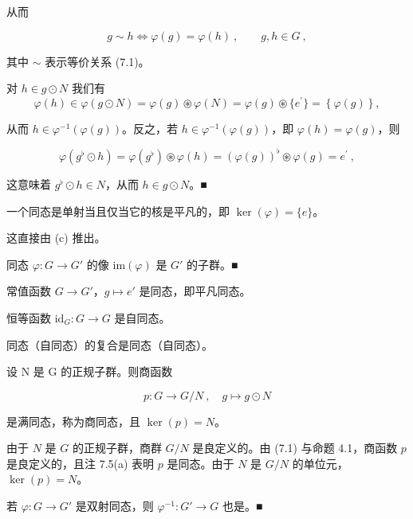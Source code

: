 \begin{remark}
\begin{items}
从而

\[
g\sim h\Longleftrightarrow\varphi(g)=\varphi(h)~,\qquad g,h\in G~,
\]

其中 $ \sim $ 表示等价关系 (7.1)。

\proofhead
对 $ h \in g \odot N $ 我们有
\[
\varphi(h)\in\varphi(g\odot N)=\varphi(g)\circledast\varphi(N)=\varphi(g)\circledast\{e^{\prime}\}=\left\{\varphi(g)\right\},
\]

从而 $ h \in \varphi^{-1}(\varphi(g)) $。反之，若 $ h \in \varphi^{-1}(\varphi(g)) $，即 $ \varphi(h) = \varphi(g) $，则

\[
\varphi(g^{\flat}\odot h)=\varphi(g^{\flat})\circledast\varphi(h)=\left(\varphi(g)\right)^{\flat}\circledast\varphi(g)=e^{\prime}~,
\]

这意味着 $ g^{\flat} \odot h \in N $，从而 $ h \in g \odot N $。■

\item

一个同态是单射当且仅当它的核是平凡的，即 $ \ker(\varphi) = \{e\} $。

\proofhead
这直接由 (c) 推出。
\item

同态 $ \varphi: G \to G' $ 的像 $ \mathrm{im}(\varphi) $ 是 $ G' $ 的子群。■

\end{items}

\end{remark}

\begin{example}

\begin{items}
\item

常值函数 $ G \to G' $，$ g \mapsto e' $ 是同态，即平凡同态。

\item

恒等函数 $ \mathrm{id}_{G}: G \to G $ 是自同态。

\item

同态（自同态）的复合是同态（自同态）。

\item

设 N 是 G 的正规子群。则商函数

\[
p\colon G\to G/N~,\quad g\mapsto g\odot N
\]

是满同态，称为商同态，且 $ \ker(p) = N $。

\proofhead
由于 $N$ 是 $G$ 的正规子群，商群 $G/N$ 是良定义的。由 (7.1) 与命题 4.1，商函数 $p$ 是良定义的，且注 7.5(a) 表明 $p$ 是同态。由于 $N$ 是 $G/N$ 的单位元，$\ker(p)=N$。
\item

若 $ \varphi: G \to G' $ 是双射同态，则 $ \varphi^{-1}: G' \to G $ 也是。■

\end{items}

\end{example}

